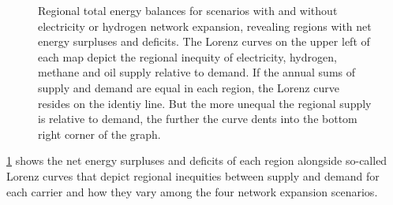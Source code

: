 \begin{figure}
    \centering
    \caption{Regional total energy balances for scenarios with and without
    electricity or hydrogen network expansion, revealing regions with net energy
    surpluses and deficits. The Lorenz curves on the upper left of each map
    depict the regional inequity of electricity, hydrogen, methane and oil
    supply relative to demand. If the annual sums of supply and demand are equal
    in each region, the Lorenz curve resides on the identiy line. But the more
    unequal the regional supply is relative to demand, the further the curve
    dents into the bottom right corner of the graph.}
    \label{fig:io}
\end{figure}

\cref{fig:io} shows the net energy surpluses and deficits of each region
alongside so-called Lorenz curves that depict regional inequities between supply
and demand for each carrier and how they vary among the four network expansion
scenarios.

